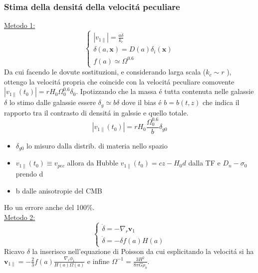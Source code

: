 \documentclass[12pt, a4paper]{article}
\begin{document}
\subsubsection{Stima della densit\'{a} della velocit\'{a} peculiare}
\underline{Metodo 1:}
\begin{equation}
\begin{cases}
\left|v_{1\parallel}\right|=\frac{a\dot{\delta}}{k_c}
\\
\delta(a, \textbf{x})=D(a) \delta_i(\textbf{x})
\\
f(a)\simeq \Omega^{0.6}
\end{cases}
\end{equation}
Da cui facendo le dovute sostituzioni, e considerando larga scala ($k_c\sim r$ ), ottengo la velocit\'{a} propria che coincide con la velocit\'{a} peculiare comovente $\left|v_{1\parallel}(t_0)\right|=r H_0\Omega_0^{0.6}\delta_0$. Ipotizzando che la massa \'{e} tutta contenuta nelle galassie $\delta$ lo stimo dalle galassie essere $\delta_g\simeq
b\delta$ dove il bias \'{e} $b=b(t,z)$ che indica il rapporto tra il contrasto di densit\'{a} in galssie e quello totale.
\begin{equation}
\left|v_{1\parallel}(t_0)\right|=r H_0\frac{\Omega_0^{0.6}}{b}\delta_{g0}
\end{equation}
\begin{itemize}
\item $\delta_{g0}$ lo misuro dalla distrib. di materia nello spazio
\item $v_{1\parallel}(t_0) \equiv v_{pec}$ allora da Hubble  $v_{1\parallel}(t_0)=cz- H_0 d$ dalla TF e $D_n -\sigma_0$ prendo d
\item b dalle anisotropie del CMB 
\end{itemize}
Ho un errore anche del 100\%.\\
\underline{Metodo 2:}
\begin{equation}
\begin{cases}
\dot{\delta}=-\nabla_r\textbf{v}_1
\\
\dot{\delta}=-\delta f(a)H(a)
\end{cases}
\end{equation}
Ricavo $\delta$ la inserisco nell'equazione di Poisson da cui esplicitando la velocit\'{a} si ha $\textbf{v}_{1\parallel}=-\frac{2}{3}f(a)\frac{\nabla_r \phi_1}{H(a)\Omega(a)}$  e infine $\Omega^{-1}=\frac{3H^2}{8\pi G\rho_b}$.
\end{document}
